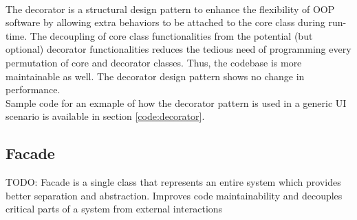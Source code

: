 \begin{multicols}{2}
\\
The decorator is a structural design pattern to enhance the flexibility of OOP software by allowing extra behaviors to be attached to the core class during run-time. The decoupling of core class functionalities from the potential (but optional) decorator functionalities reduces the tedious need of programming every permutation of core and decorator classes. Thus, the codebase is more maintainable as well. The decorator design pattern shows no change in performance.\bs
\\
Sample code for an exmaple of how the decorator pattern is used in a generic UI scenario is available in section \ref{code:decorator}.

\subsection{Facade}
TODO: Facade is a single class that represents an entire system which provides better separation and abstraction. Improves code maintainability and decouples critical parts of a system from external interactions


\end{multicols}
